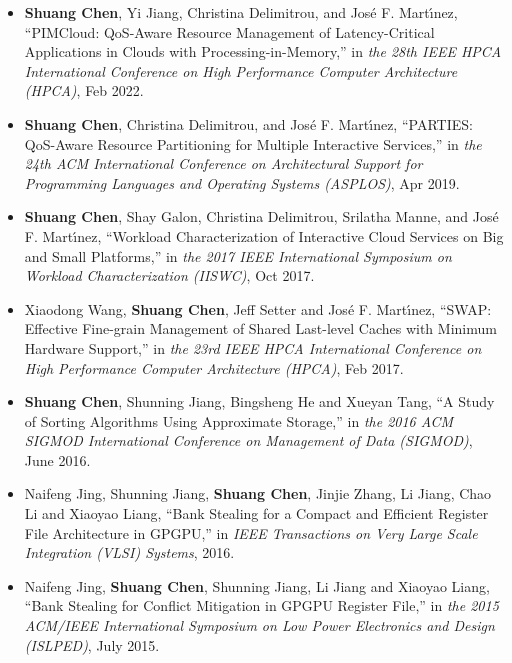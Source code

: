\documentclass{res}
\begin{document}
\begin{resume}
\begin{itemize}[leftmargin=*]
\item {\bf Shuang Chen}, Yi Jiang, Christina Delimitrou, and Jos{\'e} F. Mart{\'\i}nez, ``PIMCloud: QoS-Aware Resource Management of Latency-Critical Applications in Clouds with Processing-in-Memory,'' in {\em the 28th IEEE HPCA International Conference on High Performance Computer Architecture (HPCA)}, Feb 2022.

\item {\bf Shuang Chen}, Christina Delimitrou, and Jos{\'e} F. Mart{\'\i}nez, ``PARTIES: QoS-Aware Resource Partitioning for Multiple Interactive Services,'' in {\em the 24th ACM International Conference on Architectural Support for Programming Languages and Operating Systems (ASPLOS)}, Apr 2019.

\item {\bf Shuang Chen}, Shay Galon, Christina Delimitrou, Srilatha Manne, and Jos{\'e} F. Mart{\'\i}nez, ``Workload Characterization of Interactive Cloud Services on Big and Small Platforms,'' in {\em the 2017 IEEE International Symposium on Workload Characterization (IISWC)}, Oct 2017.

\item Xiaodong Wang, {\bf Shuang Chen}, Jeff Setter and Jos{\'e} F. Mart{\'\i}nez, ``SWAP: Effective Fine-grain Management of Shared Last-level Caches with Minimum Hardware Support,'' in {\em the 23rd IEEE HPCA International Conference on High Performance Computer Architecture (HPCA)}, Feb 2017.

\item  {\bf Shuang Chen}, Shunning Jiang, Bingsheng He and Xueyan Tang, ``A Study of Sorting Algorithms Using Approximate Storage,'' in {\em the 2016 ACM SIGMOD International Conference on Management of Data (SIGMOD)}, June 2016.

\item Naifeng Jing, Shunning Jiang, {\bf Shuang Chen}, Jinjie Zhang, Li Jiang, Chao Li and Xiaoyao Liang, ``Bank Stealing for a Compact and Efficient Register File Architecture in GPGPU,'' in {\em IEEE Transactions on Very Large Scale Integration (VLSI) Systems}, 2016.

\item Naifeng Jing, {\bf Shuang Chen}, Shunning Jiang, Li Jiang and Xiaoyao Liang, ``Bank Stealing for Conflict Mitigation in GPGPU Register File,'' in {\em the 2015 ACM/IEEE International Symposium on Low Power Electronics and Design (ISLPED)}, July 2015.

\end{itemize}


\end{resume}
\end{document}
